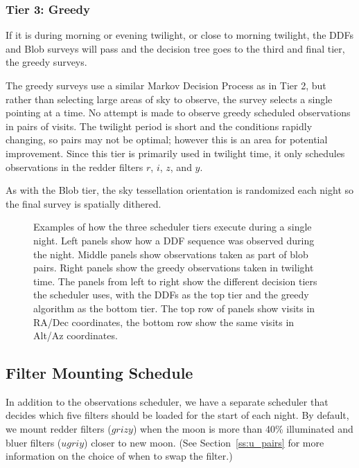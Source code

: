 \subsubsection{Tier 3:  Greedy}

If it is during morning or evening twilight, or close to morning twilight, the DDFs and Blob surveys will pass and the decision tree goes to the third and final tier, the greedy surveys. 

The greedy surveys use a similar Markov Decision Process as in Tier 2, but rather than selecting large areas of sky to observe, the survey selects a single pointing at a time.  No attempt is made to observe greedy scheduled observations in pairs of visits. The twilight period is short and the conditions rapidly changing, so pairs may not be optimal; however this is an area for potential improvement. Since this tier is primarily used in twilight time, it only schedules observations in the redder filters $r$, $i$, $z$, and $y$.  

As with the Blob tier, the sky tessellation orientation is randomized each night so the final survey is spatially dithered. 



\begin{figure}

\caption{Examples of how the three scheduler tiers execute during a single night. Left panels show how a DDF sequence was observed during the night. Middle panels show observations taken as part of blob pairs. Right panels show the greedy observations taken in twilight time.  The panels from left to right show the different decision tiers the scheduler uses, with the DDFs as the top tier and the greedy algorithm as the bottom tier.  The top row of panels show visits in RA/Dec coordinates, the bottom row show the same visits in Alt/Az coordinates. } \label{fig:examplenight}
\end{figure}

\subsection{Filter Mounting Schedule}

In addition to the observations scheduler, we have a separate scheduler that decides which five filters should be loaded for the start of each night.  By default, we mount redder filters ($grizy$) when the moon is more than 40\% illuminated and bluer filters ($ugriy$) closer to new moon. (See Section~\ref{ss:u_pairs} for more information on the choice of when to swap the filter.)

